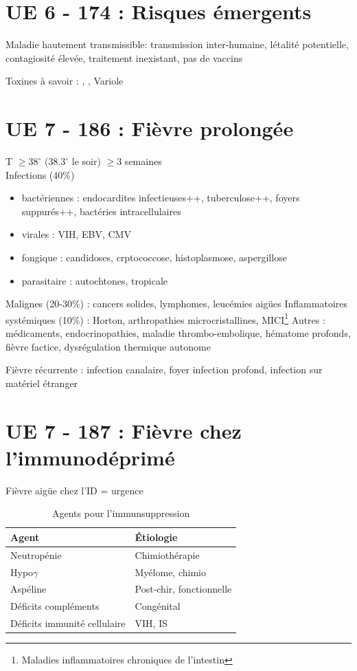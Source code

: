 \documentclass{article}
\begin{document}
\section{UE 6 - 174 : Risques émergents}%
\label{sec:item_174_risques_emergents}

Maladie hautement transmissible: transmission inter-humaine, létalité
potentielle, contagiosité élevée, traitement inexistant, pas de vaccins

Toxines à savoir : , , Variole

\section{UE 7 - 186 : Fièvre prolongée}
\label{sec:org0f8d15e}
T \(\ge 38^{\circ}\) (\(38.3^{\circ}\) le soir) \(\ge 3\) semaines\\
Infections (40\%)
\begin{itemize}
\item bactériennes : endocardites infectieuses++, tuberculose++, foyers suppurés++, bactéries intracellulaires
\item virales : VIH, EBV, CMV
\item fongique : candidoses, crptococcose, histoplasmose, aspergillose
\item parasitaire : autochtones, tropicale
\end{itemize}
Malignes (20-30\%) : cancers solides, lymphomes, leucémies aigües
Inflammatoires systémiques (10\%) : Horton, arthropathies microcristallines, MICI\footnote{Maladies inflammatoires chroniques de l'intestin}
Autres : médicaments, endocrinopathies, maladie thrombo-embolique, hématome profonds, fièvre factice, dysrégulation thermique autonome

Fièvre récurrente : infection canalaire, foyer infection profond, infection sur matériel étranger

\section{UE 7 - 187 : Fièvre chez l'immunodéprimé}
\label{sec:org3e1654b}
Fièvre aigüe chez l'ID = urgence \skull

\begin{table}[htbp]
\caption{Agents pour l'immunsuppression}
\centering
\begin{tabular}{ll}
Agent & Étiologie\\
\hline
Neutropénie & Chimiothérapie\\
Hypo\(\gamma\) & Myélome, chimio\\
Aspéline & Post-chir, fonctionnelle\\
Déficits compléments & Congénital\\
Déficits immunité cellulaire & VIH, IS\\
\end{tabular}
\end{table}
\end{document}
